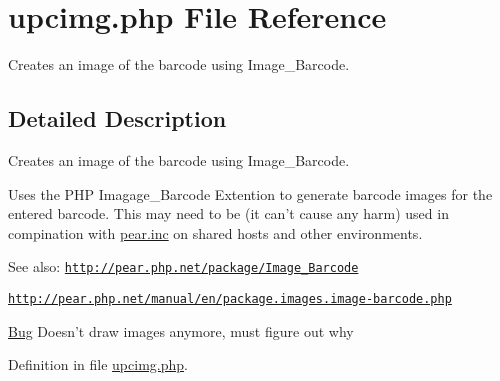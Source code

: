 \hypertarget{upcimg_8php}{
\section{upcimg.php File Reference}
\label{upcimg_8php}
}
Creates an image of the barcode using Image\_\-Barcode. 



\subsection{Detailed Description}
Creates an image of the barcode using Image\_\-Barcode. 

Uses the PHP Imagage\_\-Barcode Extention to generate barcode images for the entered barcode. This may need to be (it can't cause any harm) used in compination with \hyperlink{pear_8inc}{pear.inc} on shared hosts and other environments. \begin{Desc}
\item[See also:]\href{http://pear.php.net/package/Image_Barcode}{\tt http://pear.php.net/package/Image\_\-Barcode} 

\href{http://pear.php.net/manual/en/package.images.image-barcode.php}{\tt http://pear.php.net/manual/en/package.images.image-barcode.php}\end{Desc}
\begin{Desc}
\item[\hyperlink{bug__bug000001}{Bug}]Doesn't draw images anymore, must figure out why \end{Desc}


Definition in file \hyperlink{upcimg_8php-source}{upcimg.php}.
